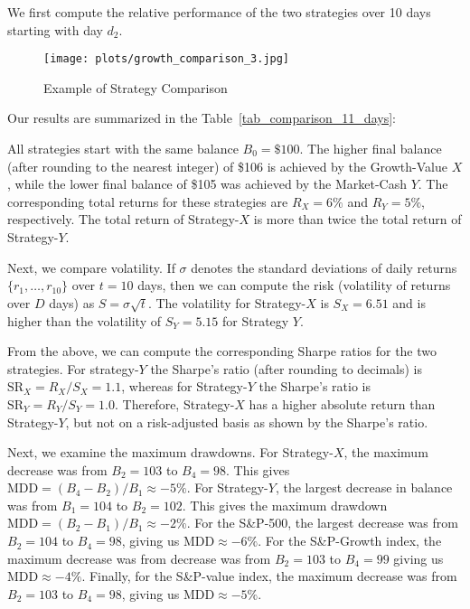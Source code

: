 \documentclass{article}
\begin{document}
We first compute the relative performance of the two strategies over 10 days starting with day $d_{2}$.


\begin{figure}[h!]
  \centering
  \texttt{[image: plots/growth\_comparison\_3.jpg]} 
  \caption{Example of Strategy Comparison}
  \label{fig:example_10_days}
\end{figure}

Our results are summarized in the Table~\ref{tab_comparison_11_days}:

All strategies start with the same balance $B_{0}=\$100$.  The higher final balance (after rounding to the nearest integer) of {\$}106 is achieved by the Growth-Value $X$, while the lower final balance of {\$}105 was achieved by the Market-Cash $Y$.
The corresponding total returns for these strategies are $R_{X}=6\%$ and $R_{Y}=5\%$, respectively. 
The total return of Strategy-$X$ is more than twice the total return of Strategy-$Y$.

Next, we compare volatility. If 
$\sigma$  denotes the standard deviations of daily returns 
$\{ r_{1}, \ldots, r_{10}\} $ over $t=10$ days, then we can compute the risk (volatility of returns over $D$ days) as $S=\sigma\sqrt{t}$. The volatility for Strategy-$X$ is $S_{X}=6.51$ and is higher than  the volatility of 
$S_{Y}=5.15$  for Strategy $Y$. 

From the above, we can compute the corresponding Sharpe 
ratios for the two strategies.
For strategy-$Y$ the Sharpe's ratio (after rounding to decimals) is $\text{SR}_{X}=R_{X}/S_{X}=1.1$, whereas for Strategy-$Y$  the Sharpe's ratio 
is $\text{SR}_{Y}=R_{Y}/S_{Y}=1.0$. Therefore, Strategy-$X$ has a higher absolute return than Strategy-$Y$, but not on a risk-adjusted basis as shown by the Sharpe's ratio.

Next,  we examine the maximum drawdowns. For Strategy-$X$, the maximum decrease was from $B_{2}=103$ to $B_{4}=98$. This gives $\text{MDD}=(B_{4}-B_{2})/B_{1}\approx -5\%$. For Strategy-$Y$, the largest decrease in balance was  from $B_{1}=104$ to $B_{2}=102$. This gives the maximum drawdown $\text{MDD}=(B_{2}-B_{1})/B_{1}\approx -2\%$.
For the S{\&}P-500, the largest decrease was from $B_{2}=104$ to $B_{4}=98$, giving us $\text{MDD}\approx -6\%$.
For the S{\&}P-Growth index,
the maximum decrease was from 
decrease was from $B_{2}=103$ to $B_{4}=99$ giving us 
$\text{MDD}\approx -4\%$. Finally, for the S{\&}P-value index, the maximum decrease was from $B_{2}=103$ to $B_{4}=98$, giving us $\text{MDD}\approx -5\%$.
\end{document}
